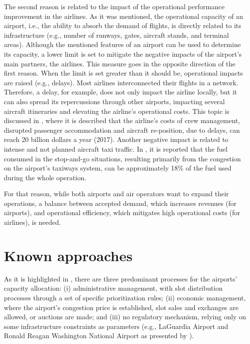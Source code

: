 The second reason is related to the impact of the operational performance improvement in the airlines. As it was mentioned, the operational capacity of an airport, i.e., the ability to absorb the demand of flights, is directly related to its infrastructure (e.g., number of runways, gates, aircraft stands, and terminal areas). Although the mentioned features of an airport can be used to determine its capacity, a lower limit is set to mitigate the negative impacts of the airport’s main partners, the airlines. This measure goes in the opposite direction of the first reason. When the limit is set greater than it should be, operational impacts are raised (e.g., delays). Most airlines interconnected their flights in a network. Therefore, a delay, for example, does not only impact the airline locally, but it can also spread its repercussions through other airports, impacting several aircraft itineraries and elevating the airline’s operational costs. This topic is discussed in \cite{ball2010total}, where it is described that the airline's costs of crew management, disrupted passenger accommodation and aircraft re-position, due to delays, can reach 20 billion dollars a year (2017). Another negative impact is related to intense and not planned aircraft taxi traffic. In \cite{nikoleris2011detailed}, it is reported that the fuel consumed in the stop-and-go situations, resulting primarily from the congestion on the airport’s taxiways system, can be approximately 18\% of the fuel used during the whole operation.

For that reason, while both airports and air operators want to expand their operations, a balance between accepted demand, which increases revenues (for airports), and operational efficiency, which mitigates high operational costs (for airlines), is needed.

\section{Known approaches}
\label{appr}

As it is highlighted in \cite{cavusoglu2021minimum} , there are three predominant processes for the airports’ capacity allocation: (i) administrative management, with slot distribution processes through a set of specific prioritization rules; (ii) economic management, where the airport’s congestion price is established, slot sales and exchanges are allowed, or auctions are made; and (iii) no regulatory mechanism, relying only on some infrastructure constraints as parameters (e.g., LaGuardia Airport and Ronald Reagan Washington National Airport as presented by \cite{FAAslots}).

